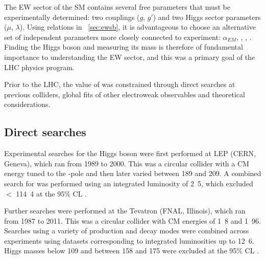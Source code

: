 
The \ac{EW} sector of the \ac{SM} contains several free parameters that must be 
experimentally determined: two couplings ($g$, $g'$) and two Higgs sector parameters 
($\mu$, $\lambda$). Using relations in \Section~\ref{sec:ewsb}, it is advantageous to 
choose an alternative set of independent parameters more closely connected to experiment: 
$\alpha_{EM}$, \mW, \mZ, \mH. Finding the Higgs boson and measuring its mass is therefore 
of fundamental importance to understanding the \ac{EW} sector, and this was a primary 
goal of the \ac{LHC} physics program.

Prior to the \ac{LHC}, the value of \mH was constrained through direct searches at 
previous colliders, global fits of other electroweak observables and theoretical 
considerations.



\subsection{Direct searches}
\label{sec:prior_constraints:direct}

Experimental searches for the Higgs boson were first performed at \acs{LEP} (CERN, 
Geneva), which ran from 1989 to 2000. This was a circular \epluseminus collider with a 
\ac{CM} energy tuned to the \PZ-pole and then later varied between 189 and 
\unit{209}{\GeV}. A combined search for \ZH was performed using an integrated luminosity 
of \unit{2.5}{\invfb}, which excluded \mH $<$ \unit{114.4}{\GeV} at the 95\% \ac{CL} 
\cite{LEP:2003}.

Further searches were performed at the Tevatron (FNAL, Illinois), which ran from 1987
to 2011. This was a circular \ppbar collider with \ac{CM} energies of \unit{1.8}{\TeV}
and \unit{1.96}{\TeV}. Searches using a variety of production and decay modes were
combined across experiments using datasets corresponding to integrated luminosities up to
\unit{12.6}{\invfb}. Higgs masses below \unit{109}{\GeV} and between 158 and 
\unit{175}{\GeV} were excluded at the 95\% \ac{CL} \cite{Tevatron:2010}.




